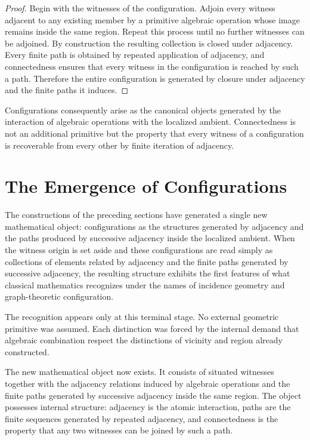 \documentclass[12pt,anyside]{book}
\begin{document}
\begin{proof}
Begin with the witnesses of the configuration. Adjoin every witness adjacent to any existing member by a primitive algebraic operation whose image remains inside the same region. Repeat this process until no further witnesses can be adjoined. By construction the resulting collection is closed under adjacency. Every finite path is obtained by repeated application of adjacency, and connectedness ensures that every witness in the configuration is reached by such a path. Therefore the entire configuration is generated by closure under adjacency and the finite paths it induces.
\end{proof}

Configurations consequently arise as the canonical objects generated by the interaction of algebraic operations with the localized ambient. Connectedness is not an additional primitive but the property that every witness of a configuration is recoverable from every other by finite iteration of adjacency.

\section{The Emergence of Configurations}
The constructions of the preceding sections have generated a single new mathematical object: configurations as the structures generated by adjacency and the paths produced by successive adjacency inside the localized ambient. When the witness origin is set aside and these configurations are read simply as collections of elements related by adjacency and the finite paths generated by successive adjacency, the resulting structure exhibits the first features of what classical mathematics recognizes under the names of incidence geometry and graph-theoretic configuration. 

The recognition appears only at this terminal stage. No external geometric primitive was assumed. Each distinction was forced by the internal demand that algebraic combination respect the distinctions of vicinity and region already constructed.

The new mathematical object now exists. It consists of situated witnesses together with the adjacency relations induced by algebraic operations and the finite paths generated by successive adjacency inside the same region. The object possesses internal structure: adjacency is the atomic interaction, paths are the finite sequences generated by repeated adjacency, and connectedness is the property that any two witnesses can be joined by such a path.
\end{document}
